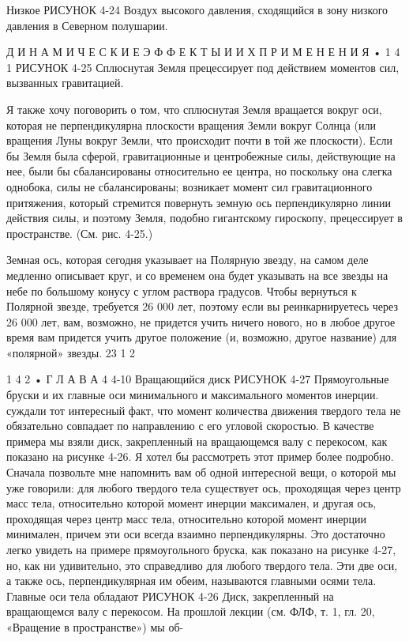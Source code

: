 \documentclass[10pt,oneside]{article}
\begin{document}
Низкое РИСУНОК 4-24 Воздух высокого давления, сходящийся в зону низкого давления в Северном полушарии.\par

Д И Н А М И Ч Е С К И Е  Э Ф Ф Е К Т Ы  И  И Х  П Р И М Е Н Е Н И Я • 1 4 1 РИСУНОК 4-25 Сплюснутая Земля прецессирует под действием моментов сил, вызванных гравитацией.\par

Я также хочу поговорить о том, что сплюснутая Земля вращается вокруг оси, которая не перпендикулярна плоскости вращения Земли вокруг Солнца (или вращения Луны вокруг Земли, что происходит почти в той же плоскости). Если бы Земля была сферой, гравитационные и центробежные силы, действующие на нее, были бы сбалансированы относительно ее центра, но поскольку она слегка однобока, силы не сбалансированы; возникает момент сил гравитационного притяжения, который стремится повернуть земную ось перпендикулярно линии действия силы, и поэтому Земля, подобно гигантскому гироскопу, прецессирует в пространстве. (См. рис. 4-25.)\par

Земная ось, которая сегодня указывает на Полярную звезду, на самом деле медленно описывает круг, и со временем она будет указывать на все звезды на небе по большому конусу с углом раствора градусов. Чтобы вернуться к Полярной звезде, требуется 26 000 лет, поэтому если вы реинкарнируетесь через 26 000 лет, вам, возможно, не придется учить ничего нового, но в любое другое время вам придется учить другое положение (и, возможно, другое название) для «полярной» звезды. 23 1 2\par

1 4 2 • Г Л А В А  4 4-10 Вращающийся диск РИСУНОК 4-27 Прямоугольные бруски и их главные оси минимального и максимального моментов инерции. суждали тот интересный факт, что момент количества движения твердого тела не обязательно совпадает по направлению с его угловой скоростью. В качестве примера мы взяли диск, закрепленный на вращающемся валу с перекосом, как показано на рисунке 4-26. Я хотел бы рассмотреть этот пример более подробно. Сначала позвольте мне напомнить вам об одной интересной вещи, о которой мы уже говорили: для любого твердого тела существует ось, проходящая через центр масс тела, относительно которой момент инерции максимален, и другая ось, проходящая через центр масс тела, относительно которой момент инерции минимален, причем эти оси всегда взаимно перпендикулярны. Это достаточно легко увидеть на примере прямоугольного бруска, как показано на рисунке 4-27, но, как ни удивительно, это справедливо для любого твердого тела. Эти две оси, а также ось, перпендикулярная им обеим, называются главными осями тела. Главные оси тела обладают РИСУНОК 4-26 Диск, закрепленный на вращающемся валу с перекосом. На прошлой лекции (см. ФЛФ, т. 1, гл. 20, «Вращение в пространстве») мы об-\par
\end{document}
